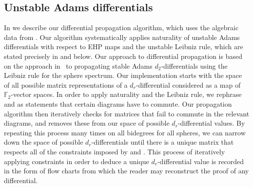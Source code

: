 \documentclass[dvipsnames,table]{amsart}
\theoremstyle{definition}
\theoremstyle{remark}
\numberwithin{equation}{section}
\begin{document}
\subsection{Unstable Adams differentials}
In  we describe our differential propagation algorithm, which uses the algebraic data from . Our algorithm systematically applies naturality of unstable Adams differentials with respect to EHP maps and the unstable Leibniz rule, which are stated precisely in  and  below. Our approach to differential propagation is based on the approach in~\cite{Beauvais_Feisthauer_2022} to propagating stable Adams $d_2$-differentials using the Leibniz rule for the sphere spectrum. Our implementation starts with the space of all possible matrix representations of a $d_r$-differential considered as a map of $\mathbb{F}_2$-vector spaces. In order to apply naturality and the Leibniz rule, we rephrase  and  as statements that certain diagrams have to commute. Our propagation algorithm then iteratively checks for matrices that fail to commute in the relevant diagrams, and removes these from our space of possible $d_r$-differential values. By repeating this process many times on all bidegrees for all spheres, we can narrow down the space of possible $d_r$-differentials until there is a unique matrix that respects all of the constraints imposed by  and . This process of iteratively applying constraints in order to deduce a unique $d_r$-differential value is recorded in the form of flow charts from which the reader may reconstruct the proof of any differential. 
\end{document}

